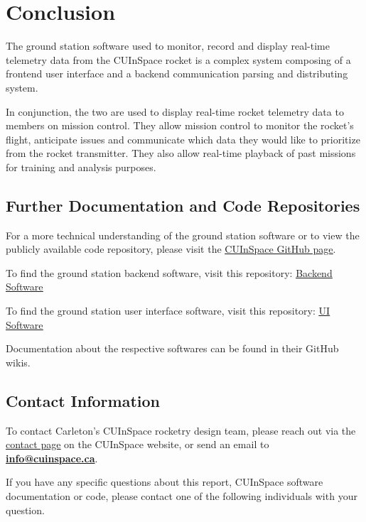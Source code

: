 \sectionfont{\fontsize{14}{14}\selectfont}
\section{Conclusion}

The ground station software used to monitor, record and display real-time telemetry data from the CUInSpace rocket is a
complex system composing of a frontend user interface and a backend communication parsing and distributing system.

In conjunction, the two are used to display real-time rocket telemetry data to members on mission control. They allow
mission control to monitor the rocket's flight, anticipate issues and communicate which data they would like to prioritize from 
the rocket transmitter. They also allow real-time playback of past missions for training and analysis purposes.

\subsection*{Further Documentation and Code Repositories}
For a more technical understanding of the ground station software or to view the publicly available code repository,
please visit the \href{https://github.com/CarletonURocketry}{\underline{CUInSpace GitHub page}}.

To find the ground station backend software, visit this repository:
\href{https://github.com/CarletonURocketry/ground-station}{\underline{Backend Software}}

To find the ground station user interface software, visit this repository:
\href{https://github.com/CarletonURocketry/ground-station-ui}{\underline{UI Software}} 

Documentation about the respective softwares can be found in their GitHub wikis.

\subsection*{Contact Information}

To contact Carleton's CUInSpace rocketry design team, please reach out via the \href{https://www.cuinspace.ca/contact-us}
{\underline{contact page}} on the CUInSpace website, or send an email to \href{mailto:info@cuinspace.ca?subject=Question regarding CU InSpace Software}{\textbf{info@cuinspace.ca}}.

If you have any specific questions about this report, CUInSpace software documentation or code, please contact one of the 
following individuals with your question.

